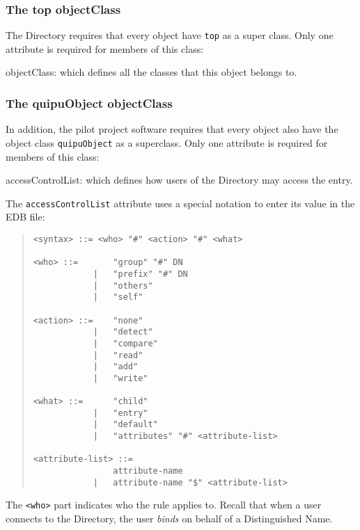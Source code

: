 \subsubsection	{The top objectClass}
The Directory requires that every object have \verb"top" as a super
class.
Only one attribute is required for members of this class:
\begin{describe}
\item[objectClass:]
			which defines all the classes that this object belongs
			to.
\end{describe}

\subsubsection	{The quipuObject objectClass}
In addition,
the pilot project software requires that every object also have the object
class \verb"quipuObject" as a superclass.
Only one attribute is required for members of this class:
\begin{describe}
\item[accessControlList:]
			which defines how users of the Directory may
			access the entry.
\end{describe}
The \verb"accessControlList" attribute uses a special notation to enter
its value in the EDB file:
\begin{quote}\small\begin{verbatim}
<syntax> ::= <who> "#" <action> "#" <what>

<who> ::=       "group" "#" DN
            |   "prefix" "#" DN
            |   "others"
            |   "self"

<action> ::=    "none"
            |   "detect"
            |   "compare"
            |   "read"
            |   "add"
            |   "write"

<what> ::=      "child"
            |   "entry"
            |   "default"
            |   "attributes" "#" <attribute-list>

<attribute-list> ::=
                attribute-name
            |   attribute-name "$" <attribute-list>
\end{verbatim}\end{quote}
The \verb"<who>" part indicates who the rule applies to.
Recall that when a user connects to the Directory,
the user {\em binds\/} on behalf of a Distinguished Name.
